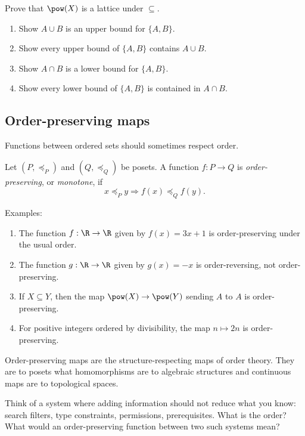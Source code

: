 \begin{labbox}
Prove that $\pow(X)$ is a lattice under $\subseteq$.
\begin{enumerate}
\item Show $A\cup B$ is an upper bound for $\{A,B\}$.
\item Show every upper bound of $\{A,B\}$ contains $A\cup B$.
\item Show $A\cap B$ is a lower bound for $\{A,B\}$.
\item Show every lower bound of $\{A,B\}$ is contained in $A\cap B$.
\end{enumerate}
\end{labbox}

\subsection{Order-preserving maps}

Functions between ordered sets should sometimes respect order.

\begin{definition}
Let $(P,\preceq_P)$ and $(Q,\preceq_Q)$ be posets. A function $f:P\to Q$ is \emph{order-preserving}, or \emph{monotone}, if
\[
x\preceq_P y\Rightarrow f(x)\preceq_Q f(y).
\]
\end{definition}

Examples:

\begin{enumerate}
\item The function $f:\R\to\R$ given by $f(x)=3x+1$ is order-preserving under the usual order.
\item The function $g:\R\to\R$ given by $g(x)=-x$ is order-reversing, not order-preserving.
\item If $X\subseteq Y$, then the map $\pow(X)\to\pow(Y)$ sending $A$ to $A$ is order-preserving.
\item For positive integers ordered by divisibility, the map $n\mapsto 2n$ is order-preserving.
\end{enumerate}

Order-preserving maps are the structure-respecting maps of order theory. They are to posets what homomorphisms are to algebraic structures and continuous maps are to topological spaces.

\begin{walkbox}
Think of a system where adding information should not reduce what you know: search filters, type constraints, permissions, prerequisites. What is the order? What would an order-preserving function between two such systems mean?
\end{walkbox}


